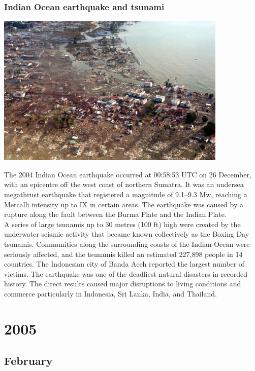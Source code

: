 \documentclass[11pt]{report}
\begin{document}
\subsection{Indian Ocean earthquake and tsunami}
\vspace{2mm}\begin{center}\includegraphics[width=11cm]{./img/2004tsunami.jpg}\end{center}
The 2004 Indian Ocean earthquake occurred at 00:58:53 UTC on 26 December, with an epicentre off the west coast of northern Sumatra. It was an undersea megathrust earthquake that registered a magnitude of 9.1–9.3 Mw, reaching a Mercalli intensity up to IX in certain areas. The earthquake was caused by a rupture along the fault between the Burma Plate and the Indian Plate.\\
A series of large tsunamis up to 30 metres (100 ft) high were created by the underwater seismic activity that became known collectively as the Boxing Day tsunamis. Communities along the surrounding coasts of the Indian Ocean were seriously affected, and the tsunamis killed an estimated 227,898 people in 14 countries. The Indonesian city of Banda Aceh reported the largest number of victims. The earthquake was one of the deadliest natural disasters in recorded history. The direct results caused major disruptions to living conditions and commerce particularly in Indonesia, Sri Lanka, India, and Thailand.

\chapter{2005}
\section{February}
\end{document}
